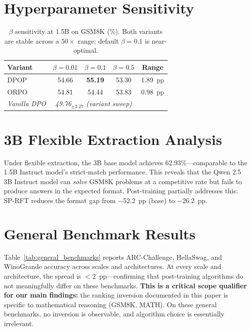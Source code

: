 \documentclass{article}
\newcommand{\sprft}{SP-RFT}
\begin{document}
\section{Hyperparameter Sensitivity}
\label{app:hp_sensitivity}

\begin{table}[ht]
\centering
\caption{$\beta$ sensitivity at 1.5B on GSM8K (\%). Both variants are stable across a $50\times$ range; default $\beta = 0.1$ is near-optimal.}
\label{tab:hp_sensitivity}
\small
\begin{tabular}{@{}lcccc@{}}
\toprule
\textbf{Variant} & $\beta = 0.01$ & $\beta = 0.1$ & $\beta = 0.5$ & \textbf{Range} \\
\midrule
DPOP & 54.66 & \textbf{55.19} & 53.30 & 1.89~pp \\
ORPO & 54.81 & 54.44 & 53.83 & 0.98~pp \\
\midrule
\textit{Vanilla DPO} & \multicolumn{3}{c}{\textit{49.76$_{\pm 2.27}$ (variant sweep)}} & \\
\bottomrule
\end{tabular}
\end{table}

\section{3B Flexible Extraction Analysis}
\label{app:3b_flex}

Under flexible extraction, the 3B base model achieves 62.93\%---comparable to the 1.5B Instruct model's strict-match performance. This reveals that the Qwen 2.5 3B Instruct model can \emph{solve} GSM8K problems at a competitive rate but fails to produce answers in the expected format. Post-training partially addresses this: \sprft{} reduces the format gap from $-$52.2~pp (base) to $-$26.2~pp.

\section{General Benchmark Results}
\label{app:general_benchmarks}

Table~\ref{tab:general_benchmarks} reports ARC-Challenge, HellaSwag, and WinoGrande accuracy across scales and architectures. At every scale and architecture, the spread is $<$2~pp---confirming that post-training algorithms do not meaningfully differ on these benchmarks. \textbf{This is a critical scope qualifier for our main findings:} the ranking inversion documented in this paper is specific to mathematical reasoning (GSM8K, MATH). On these general benchmarks, no inversion is observable, and algorithm choice is essentially irrelevant.
\end{document}
